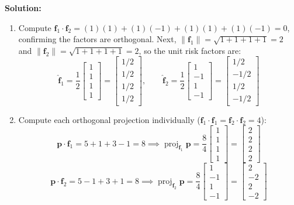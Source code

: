 \documentclass[11pt, letterpaper]{article}
\theoremstyle{definition}
\theoremstyle{remark}
\begin{document}
\textbf{Solution:}
\begin{enumerate}[label=(\alph*)]
    \item Compute $\mathbf{f}_1 \cdot \mathbf{f}_2 = (1)(1) + (1)(-1) + (1)(1) + (1)(-1) = 0$, confirming the factors are orthogonal. Next, $\|\mathbf{f}_1\| = \sqrt{1+1+1+1} = 2$ and $\|\mathbf{f}_2\| = \sqrt{1+1+1+1} = 2$, so the unit risk factors are:
    \[
    \hat{\mathbf{f}}_1 = \frac{1}{2}\begin{bmatrix} 1 \\ 1 \\ 1 \\ 1 \end{bmatrix} = \begin{bmatrix} 1/2 \\ 1/2 \\ 1/2 \\ 1/2 \end{bmatrix}, \qquad \hat{\mathbf{f}}_2 = \frac{1}{2}\begin{bmatrix} 1 \\ -1 \\ 1 \\ -1 \end{bmatrix} = \begin{bmatrix} 1/2 \\ -1/2 \\ 1/2 \\ -1/2 \end{bmatrix}
    \]
    \item Compute each orthogonal projection individually ($\mathbf{f}_1 \cdot \mathbf{f}_1 = \mathbf{f}_2 \cdot \mathbf{f}_2 = 4$):
    \[
    \mathbf{p} \cdot \mathbf{f}_1 = 5 + 1 + 3 - 1 = 8 \implies \operatorname{proj}_{\mathbf{f}_1}\mathbf{p} = \frac{8}{4}\begin{bmatrix} 1 \\ 1 \\ 1 \\ 1 \end{bmatrix} = \begin{bmatrix} 2 \\ 2 \\ 2 \\ 2 \end{bmatrix}
    \]
    \[
    \mathbf{p} \cdot \mathbf{f}_2 = 5 - 1 + 3 + 1 = 8 \implies \operatorname{proj}_{\mathbf{f}_2}\mathbf{p} = \frac{8}{4}\begin{bmatrix} 1 \\ -1 \\ 1 \\ -1 \end{bmatrix} = \begin{bmatrix} 2 \\ -2 \\ 2 \\ -2 \end{bmatrix}
\]
\end{enumerate}
\end{document}
